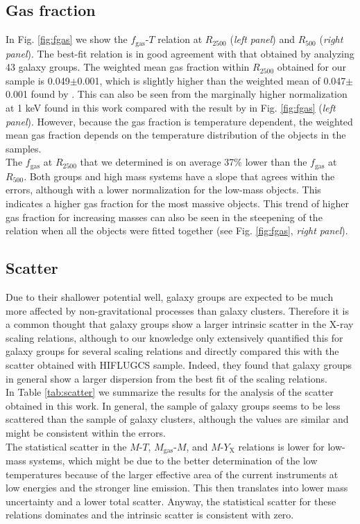 \documentclass{aa} %
\begin{document}
\subsection{Gas fraction}
In Fig. \ref{fig:fgas} we show the $f_{\text{gas}}$-$T$ relation at $R_{2500}$ ({\it left panel})
and $R_{500}$ ({\it right panel}). The best-fit relation is in good agreement with that
obtained by \citet{2009ApJ...693.1142S} analyzing 43 galaxy
groups. The weighted mean gas fraction within $R_{2500}$ obtained for our
sample is 0.049$\pm$0.001, which is slightly higher than the weighted mean of 0.047$\pm$0.001 found by \citet{2009ApJ...693.1142S}. This can also be seen from the marginally higher
normalization at 1 keV found in this work compared with the result by
\citet{2009ApJ...693.1142S} in Fig. \ref{fig:fgas} ({\it left
  panel}). However, because the gas fraction is temperature dependent, the weighted mean gas fraction depends on the temperature distribution of the objects in the samples.  \\ The $f_{\text{gas}}$ at $R_{2500}$ that we determined is on
average 37$\%$ lower than the $f_{\text{gas}}$ at $R_{500}$. Both groups and high mass systems have a slope that agrees within the errors, although with a lower normalization for the low-mass objects. This indicates a higher gas fraction for the most massive objects. This trend of higher gas fraction for increasing masses can also be seen in the steepening of the relation when all the objects were fitted together (see Fig. \ref{fig:fgas}, {\it right panel}).

\subsection{Scatter} \label{secscatter} 
Due to their shallower
potential well, galaxy groups are expected to be much more affected by non-gravitational processes than galaxy clusters. Therefore it is a
common thought that galaxy groups show a larger intrinsic scatter in the X-ray scaling relations,
although to our knowledge only \cite{2011A&A...535A.105E} extensively
quantified this for galaxy groups for several scaling relations and directly compared this with the scatter obtained with HIFLUGCS sample. Indeed, they found that
galaxy groups in general show a larger dispersion from the best fit of
the scaling relations. \\
In Table \ref{tab:scatter} we summarize the results for the analysis
of the scatter obtained in this work. In general, the sample of galaxy groups seems to be less scattered than the sample of galaxy clusters, although the values are similar  and might be consistent within the errors. \\
The statistical scatter in the $M$-$T$, $M_{\text{gas}}$-$M$, and $M$-$Y_{\text{X}}$ relations is lower for low-mass
systems, which might be due to the better determination of the low temperatures because of the larger effective area of the current
instruments at low energies and the stronger line emission. This then translates into  lower mass
uncertainty  and a lower total scatter.  Anyway, the statistical scatter for these relations dominates 
and the intrinsic scatter is consistent with zero.
\end{document}
